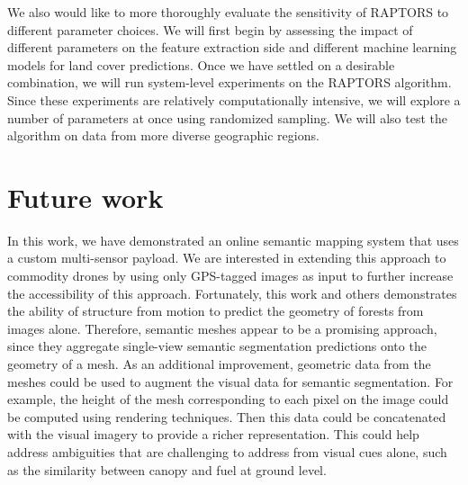 We also would like to more thoroughly evaluate the sensitivity of RAPTORS to different parameter choices. We will first begin by assessing the impact of different parameters on the feature extraction side and different machine learning models for land cover predictions. Once we have settled on a desirable combination, we will run system-level experiments on the RAPTORS algorithm. Since these experiments are relatively computationally intensive, we will explore a number of parameters at once using randomized sampling. We will also test the algorithm on data from more diverse geographic regions.

\section{Future work}
In this work, we have demonstrated an online semantic mapping system that uses a custom multi-sensor payload. We are interested in extending this approach to commodity drones by using only GPS-tagged images as input to further increase the accessibility of this approach. Fortunately, this work and others demonstrates the ability of structure from motion to predict the geometry of forests from images alone. Therefore, semantic meshes \cite{} appear to be a promising approach, since they aggregate single-view semantic segmentation predictions onto the geometry of a mesh. As an additional improvement, geometric data from the meshes could be used to augment the visual data for semantic segmentation. For example, the height of the mesh corresponding to each pixel on the image could be computed using rendering techniques. Then this data could be concatenated with the visual imagery to provide a richer representation. This could help address ambiguities that are challenging to address from visual cues alone, such as the similarity between canopy and fuel at ground level.  


